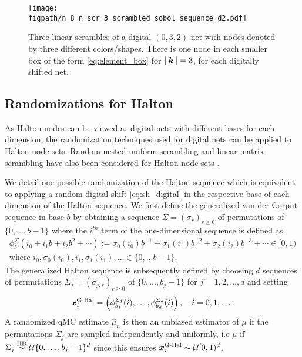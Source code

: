 \documentclass{svproc}
\newcommand{\figpath}{Figures}
\begin{document}
\begin{figure}
	\centering
	\texttt{[image: \\figpath/n\_8\_n\_scr\_3\_scrambled\_sobol\_sequence\_d2.pdf]}
	\caption{Three linear scrambles of a digital $(0,3,2)$-net with nodes denoted by three different colors/shapes.  There is one node in each smaller box of the form \eqref{eq:element_box} for $\lVert {\boldsymbol{k}} \rVert = 3$, for each digitally shifted net. \label{fig:scrambled_net}}
\end{figure}

\subsection{Randomizations for Halton}\label{sec:randHalton}


As Halton nodes can be viewed as digital nets with different bases for each dimension, the randomization techniques used for digital nets can be applied to Halton node sets. Random nested uniform scrambling and linear matrix scrambling have also been considered for Halton node sets \cite{owen2024gain}.

We detail one possible randomization of the Halton sequence which is equivalent to applying a random digital shift \eqref{eq:sh_digital} in the respective base of each dimension of the Halton sequence. We first define the generalized van der Corput sequence in base $b$ by obtaining a sequence $\Sigma = (\sigma_r)_{r\geq0}$ of permutations of $\{0,\ldots,b-1\}$ where the $i^{th}$ term of the one-dimensional sequence is defined as 
\begin{multline}\label{eq:gen_vdc}
    \phi_b^{\Sigma}(i_0 + i_1b + i_2 b^2 + \cdots ) := \sigma_0(i_0) b^{-1} + \sigma_1(i_1) b^{-2} + \sigma_2(i_2) b^{-3} + \cdots \in [0,1)
	\\
	 \text{where } i_0, \sigma_0(i_0), i_1, \sigma_1(i_1), \ldots \in \{0,\ldots b-1\}.
\end{multline}
The generalized Halton sequence is subsequently defined by choosing $d$ sequences of permutations $\Sigma_j = (\sigma_{j,r})_{r\geq0}$ of $\{0,\ldots,b_j-1\}$ for $j = 1, 2,\ldots,d$ and setting
$$
{\boldsymbol{x}}_i^{\text{G-Hal}} = \left( \phi^{\Sigma_1}_{b_1}(i), \ldots, \phi^{\Sigma_d}_{b_d}(i)\right), \quad i= 0,1,\ldots.
$$ 
A randomized qMC estimate $\hat{\mu}_n$ is then an unbiased estimator of $\mu$ if the permutations $\Sigma_j$ are sampled independently and uniformly, i.e $\mu$ if $\Sigma_j \overset{\text{IID}}{\sim} {\mathcal{U}}\{0,\dots,b_j-1\}^d$ since this ensures ${\boldsymbol{x}}_i^{\text{G-Hal}} \sim \mathcal{U}[0,1)^d$. 
\end{document}
